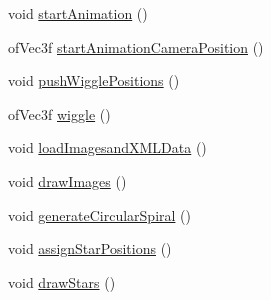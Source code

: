 \begin{DoxyCompactItemize}
\item 
void \hyperlink{group___camera_ga79467453f6ea0dd63961a810dca9ac6a}{start\-Animation} ()
\item 
of\-Vec3f \hyperlink{group___camera_ga1a97063e992528dc79867e516d9365f0}{start\-Animation\-Camera\-Position} ()
\item 
void \hyperlink{group___wiggle_gaaa5c2175be1d5ca404c3c23a898d0cdd}{push\-Wiggle\-Positions} ()
\item 
of\-Vec3f \hyperlink{group___wiggle_gacd718eb54b9dc2b45e463414c24de6b9}{wiggle} ()
\item 
void \hyperlink{classtest_app_aa93380112b906e2aac2d8738309b2d17}{load\-Imagesand\-X\-M\-L\-Data} ()
\item 
void \hyperlink{classtest_app_a6dbcb5f1e47c842dfd1ab6b188097677}{draw\-Images} ()
\item 
void \hyperlink{classtest_app_aa30f4f1db2d186466f97e6ca15169712}{generate\-Circular\-Spiral} ()
\end{DoxyCompactItemize}
{\bf }\par
\begin{DoxyCompactItemize}
\item 
void \hyperlink{classtest_app_a57e6d61c73ba0244b9d7a8c227aec244}{assign\-Star\-Positions} ()
\item 
void \hyperlink{classtest_app_a3ea688a73ca9eb760a3f0a07fde0ac10}{draw\-Stars} ()
\end{DoxyCompactItemize}

